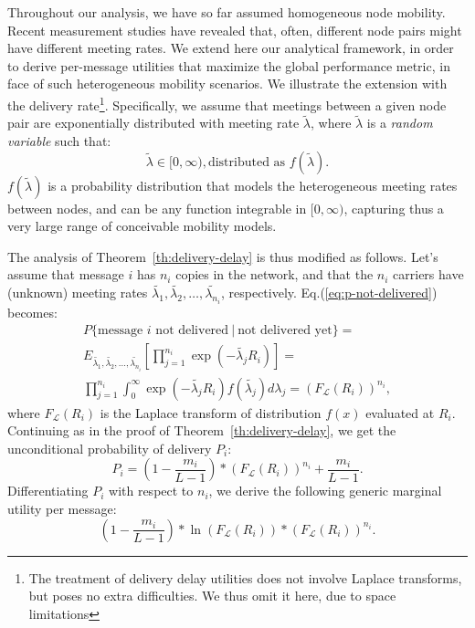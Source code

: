 Throughout our analysis, we have so far assumed homogeneous node mobility. Recent measurement studies have revealed that, often, different node pairs might have different meeting rates. We extend here our analytical framework, in order to derive per-message utilities that maximize the global performance metric, in face of such heterogeneous mobility scenarios. We illustrate the extension with the delivery rate\footnote{The treatment of delivery delay utilities does not involve Laplace transforms, but poses no extra difficulties. We thus omit it here, due to space limitations}. Specifically, we assume that meetings between a given node pair are exponentially distributed with meeting rate $\tilde{\lambda}$, where $\tilde{\lambda}$ is a \emph{random variable} such that:
\begin{equation*}
\tilde{\lambda} \in [0,\infty), \mbox{distributed as } f(\tilde{\lambda}).
\end{equation*}
$f(\tilde{\lambda})$ is a probability distribution that models the heterogeneous meeting rates between nodes, and can be any function integrable in $[0,\infty)$, capturing thus a very large range of conceivable mobility models.

The analysis of Theorem~\ref{th:delivery-delay} is thus modified as follows. Let's assume that message $i$ has $n_{i}$ copies in the network, and that the $n_{i}$ carriers have (unknown) meeting rates $\tilde{\lambda_{1}},\tilde{\lambda_{2}},\dots,\tilde{\lambda_{n_{i}}}$, respectively. Eq.(\ref{eq:p-not-delivered}) becomes:
\begin{eqnarray}
P\{\mbox{message\ $i$ not\ delivered}\ |\ \mbox{not\ delivered\ yet}  \}= \nonumber \\
E_{\tilde{\lambda_{1}},\tilde{\lambda_{2}},\dots,\tilde{\lambda_{n_{i}}}} [ \prod_{j=1}^{n_i}\exp(-\tilde{\lambda_{j}} R_i ) ] = \\
\prod_{j=1}^{n_i} \int_{0}^{\infty} \exp(-\tilde{\lambda_{j}} R_i ) f(\tilde{\lambda_{j}}) d\lambda_{j}  = (F_{\mathcal{L}}(R_{i}))^{n_{i}}, \label{eq:conditional-delivery}
\end{eqnarray}
where $F_{\mathcal{L}}(R_{i})$ is the Laplace transform of distribution $f(x)$ evaluated at $R_{i}$. Continuing as in the proof of Theorem~\ref{th:delivery-delay}, we get the unconditional probability of delivery $P_{i}$:
\begin{equation*}
P_{i} = (1 - \frac{m_i}{L-1})* (F_{\mathcal{L}}(R_{i}))^{n_{i}}+\frac{m_i}{L-1}.
\end{equation*}
Differentiating $P_{i}$ with respect to $n_{i}$, we derive the following generic marginal utility per message:
\begin{equation} \label{eq:general-utility-delivery}
(1 - \frac{m_i}{L-1}) * \ln(F_{\mathcal{L}}(R_{i})) * (F_{\mathcal{L}}(R_{i}))^{n_{i}}.
\end{equation}

